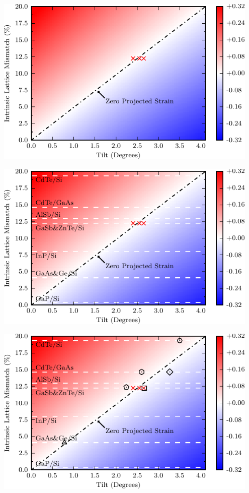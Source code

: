 \documentclass[]{beamer}%
\begin{document}
\begin{frame}
    \begin{center}
        \includegraphics[width=0.95\textwidth]{graphics/tiltmap/step2}
    \end{center}
\end{frame}

\begin{frame}
    \begin{center}
        \includegraphics[width=0.95\textwidth]{graphics/tiltmap/step3}
    \end{center}
\end{frame}

\begin{frame}
    \begin{center}
        \includegraphics[width=0.95\textwidth]{graphics/tiltmap/step4}
    \end{center}
\end{frame}
\end{document}

